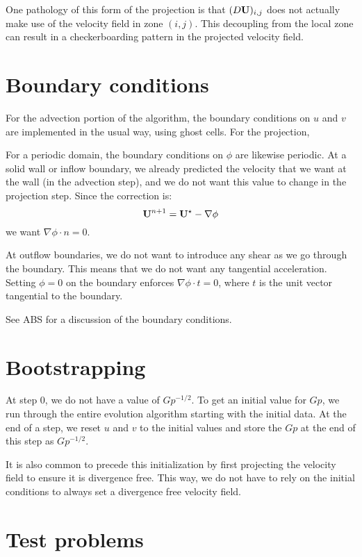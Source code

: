 One pathology of this form of the projection is that $(D{\bf U})_{i,j}$ does
not actually make use of the velocity field in zone $(i,j)$.  This
decoupling from the local zone can result in a checkerboarding pattern
in the projected velocity field.

\section{Boundary conditions}

For the advection portion of the algorithm, the boundary conditions
on $u$ and $v$ are implemented in the usual way, using ghost cells.
For the projection, 

For a periodic domain, the boundary conditions on $\phi$ are likewise
periodic.  At a solid wall or inflow boundary, we already predicted
the velocity that we want at the wall (in the advection step), and we
do not want this value to change in the projection step.  Since the
correction is:
\begin{equation}
{\bf U}^{n+1} = {\bf U}^\star - \nabla \phi
\end{equation}
we want $\nabla \phi \cdot n = 0$.  

At outflow boundaries, we do not want to introduce any shear as we go
through the boundary.  This means that we do not want any tangential
acceleration.  Setting $\phi = 0$ on the boundary enforces $\nabla
\phi \cdot t = 0$, where $t$ is the unit vector tangential to the
boundary.

See ABS for a discussion of the boundary conditions.

\section{Bootstrapping}

At step 0, we do not have a value of $Gp^{-1/2}$.  To get an initial value
for $Gp$, we run through the entire evolution algorithm starting with the
initial data.  At the end of a step, we reset $u$ and $v$ to the initial
values and store the $Gp$ at the end of this step as $Gp^{-1/2}$.

It is also common to precede this initialization by first projecting
the velocity field to ensure it is divergence free.  This way, we do
not have to rely on the initial conditions to always set a divergence
free velocity field.


\section{Test problems}

